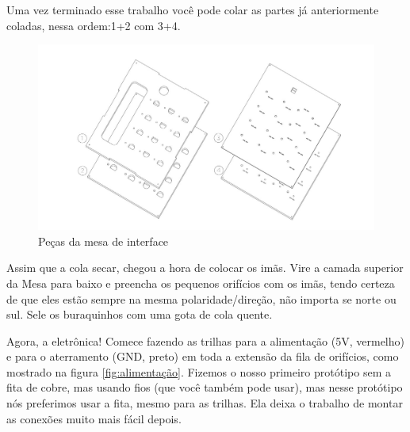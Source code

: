 \documentclass[paper=a4, fontsize=11pt]{scrartcl} %
\numberwithin{equation}{section} %
\numberwithin{figure}{section} %
\numberwithin{table}{section} %
\begin{document}
Uma vez terminado esse trabalho você pode colar as partes já anteriormente coladas, nessa ordem:1+2 com 3+4.

\begin{figure}[h!] %
 \centering
 \includegraphics[scale=0.15]{./imagens/board-esploso.jpg}
 \caption[ ]{Peças da mesa de interface}
 \end{figure}
 
 Assim que a cola secar, chegou a hora de colocar os imãs. Vire a camada superior da Mesa para baixo e preencha os pequenos orifícios com os imãs, tendo certeza de que eles estão sempre na mesma polaridade/direção, não importa se norte ou sul. Sele os buraquinhos com uma gota de cola quente.
 
 Agora, a eletrônica! Comece fazendo as trilhas para a alimentação (5V, vermelho) e para o aterramento (GND, preto) em toda a extensão da fila de orifícios, como mostrado na figura \ref{fig:alimentação}. Fizemos o nosso primeiro protótipo sem a fita de cobre, mas usando fios (que você também pode usar), mas nesse protótipo nós preferimos usar a fita, mesmo para as trilhas. Ela deixa o trabalho de montar as conexões muito mais fácil depois.
 
\end{document}
